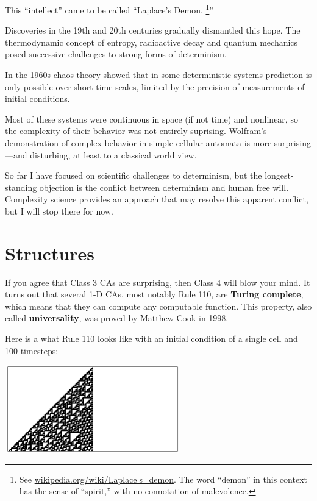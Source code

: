 \documentclass[10pt]{book}
\begin{document}
This ``intellect'' came to be called ``Laplace's Demon.
\footnote{See \url{wikipedia.org/wiki/Laplace's_demon}.  The word
  ``demon'' in this context has the sense of ``spirit,'' with no
  connotation of malevolence.}''

Discoveries in the 19th and 20th centuries gradually dismantled
this hope.  The thermodynamic concept of entropy, radioactive decay
and quantum mechanics posed successive challenges to strong
forms of determinism.  

In the 1960s chaos theory showed that in some deterministic systems
prediction is only possible over short time scales,  limited by
the precision of measurements of initial conditions.

Most of these systems were continuous in space (if not time)
and nonlinear, so the complexity of their behavior was not
entirely suprising.  Wolfram's demonstration of
complex behavior in simple cellular automata is
more surprising---and disturbing, at least to a classical
world view.

So far I have focused on scientific challenges to determinism, but the
longest-standing objection is the conflict between
determinism and human free will.  Complexity science provides
an approach that may resolve this apparent conflict, but I
will stop there for now.


\section{Structures}

If you agree that Class 3 CAs are surprising, then Class 4 will blow
your mind.  It turns out that several 1-D CAs, most notably Rule 110,
are {\bf Turing complete}, which means that they can compute any
computable function.  This property, also called {\bf universality},
was proved by Matthew Cook in 1998.

Here is a what Rule 110 looks like with an initial condition of
a single cell and 100 timesteps:

\beforefig
\centerline{\includegraphics[width=3.0in,height=1.5in]{figs/rule110.eps}}
\afterfig
\end{document}

